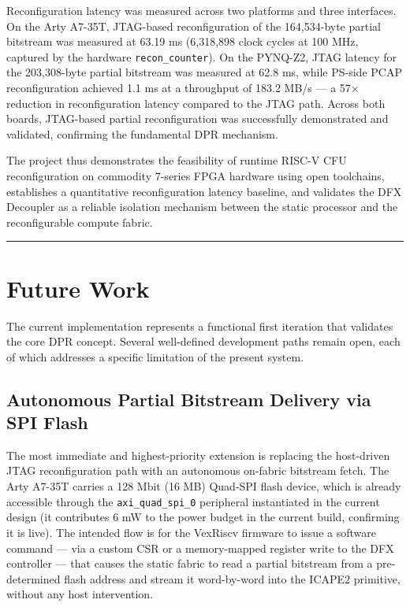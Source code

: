 Reconfiguration latency was measured across two platforms and three interfaces. On the Arty A7-35T, JTAG-based reconfiguration of the 164,534-byte partial bitstream was measured at 63.19 ms (6,318,898 clock cycles at 100 MHz, captured by the hardware \texttt{recon\_counter}). On the PYNQ-Z2, JTAG latency for the 203,308-byte partial bitstream was measured at 62.8 ms, while PS-side PCAP reconfiguration achieved 1.1 ms at a throughput of 183.2 MB/s — a 57× reduction in reconfiguration latency compared to the JTAG path. Across both boards, JTAG-based partial reconfiguration was successfully demonstrated and validated, confirming the fundamental DPR mechanism.

The project thus demonstrates the feasibility of runtime RISC-V CFU reconfiguration on commodity 7-series FPGA hardware using open toolchains, establishes a quantitative reconfiguration latency baseline, and validates the DFX Decoupler as a reliable isolation mechanism between the static processor and the reconfigurable compute fabric.

\vspace{0.4em}\hrule\vspace{0.4em}

\section{Future Work}

The current implementation represents a functional first iteration that validates the core DPR concept. Several well-defined development paths remain open, each of which addresses a specific limitation of the present system.

\subsection{Autonomous Partial Bitstream Delivery via SPI Flash}

The most immediate and highest-priority extension is replacing the host-driven JTAG reconfiguration path with an autonomous on-fabric bitstream fetch. The Arty A7-35T carries a 128 Mbit (16 MB) Quad-SPI flash device, which is already accessible through the \texttt{axi\_quad\_spi\_0} peripheral instantiated in the current design (it contributes 6 mW to the power budget in the current build, confirming it is live). The intended flow is for the VexRiscv firmware to issue a software command — via a custom CSR or a memory-mapped register write to the DFX controller — that causes the static fabric to read a partial bitstream from a pre-determined flash address and stream it word-by-word into the ICAPE2 primitive, without any host intervention.

